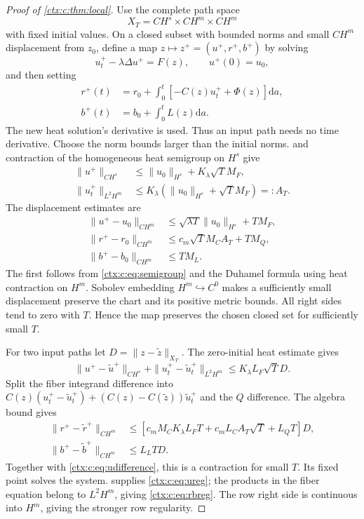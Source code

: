 \begin{proof}[Proof of \cref{ctx:c:thm:local}]
Use the complete path space
\begin{equation}
 X_T=CH^s\times CH^m\times CH^m
\end{equation}
with fixed initial values. On a closed subset with bounded norms and small $CH^m$ displacement from $z_0$, define a map $z\mapsto z^+=(u^+,r^+,b^+)$ by solving
\begin{equation}
 u_t^+-\lambda\Delta u^+=F(z),\qquad u^+(0)=u_0,
\end{equation}
and then setting
\begin{align}
 r^+(t)&=r_0+\int_0^t[-C(z)u_t^++\Phi(z)]\mathrm d a,\\
 b^+(t)&=b_0+\int_0^tL(z)\mathrm d a.
 \label{ctx:c:eq:picard}
\end{align}
The new heat solution's derivative is used. Thus an input path needs no time derivative. Choose the norm bounds larger than the initial norms.  and contraction of the homogeneous heat semigroup on $H^s$ give
\begin{align}
 \|u^+\|_{CH^s}&\leq\|u_0\|_{H^s}+K_\lambda\sqrt T M_F,\\
 \|u_t^+\|_{L^2H^m}&\leq
 K_\lambda(\|u_0\|_{H^s}+\sqrt T M_F)=:A_T.
 \label{ctx:c:eq:A}
\end{align}
The displacement estimates are
\begin{align}
 \|u^+-u_0\|_{CH^m}&\leq
           \sqrt{\lambda T}\|u_0\|_{H^s}+TM_F,\label{ctx:c:eq:preserve-u}\\
 \|r^+-r_0\|_{CH^m}&\leq c_m\sqrt T M_C A_T+TM_Q,\\
 \|b^+-b_0\|_{CH^m}&\leq TM_L.
 \label{ctx:c:eq:preserve}
\end{align}
The first follows from \cref{ctx:c:eq:semigroup} and the Duhamel formula using heat contraction on $H^m$. Sobolev embedding $H^m\hookrightarrow C^0$ makes a sufficiently small displacement preserve the chart and its positive metric bounds. All right sides tend to zero with $T$. Hence the map preserves the chosen closed set for sufficiently small $T$.

For two input paths let $D=\|z-\widetilde z\|_{X_T}$. The zero-initial heat estimate gives
\begin{equation}
 \|u^+-\widetilde u^+\|_{CH^s}
 +\|u_t^+-\widetilde u_t^+\|_{L^2H^m}
 \leq K_\lambda L_F\sqrt T D.
 \label{ctx:c:eq:udifference}
\end{equation}
Split the fiber integrand difference into
$C(z)(u_t^+-\widetilde u_t^+)
 +(C(z)-C(\widetilde z))\widetilde u_t^+$
and the $Q$ difference. The algebra bound gives
\begin{align}
 \|r^+-\widetilde r^+\|_{CH^m}
 &\leq[c_m M_CK_\lambda L_F T+c_mL_C A_T\sqrt T+L_QT]D,\\
 \|b^+-\widetilde b^+\|_{CH^m}&\leq L_LT D.
 \label{ctx:c:eq:rbdifference}
\end{align}
Together with \cref{ctx:c:eq:udifference}, this is a contraction for small $T$. Its fixed point solves the system.  supplies \cref{ctx:c:eq:ureg}; the products in the fiber equation belong to $L^2H^m$, giving \cref{ctx:c:eq:rbreg}. The row right side is continuous into $H^m$, giving the stronger row regularity.


\end{proof}
